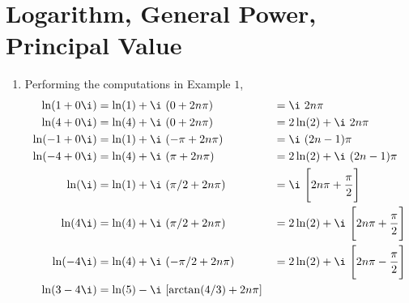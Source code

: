 \section{Logarithm, General Power, Principal Value}

\begin{enumerate}
    \item Performing the computations in Example $ 1 $,
          \begin{align}
              \ln(1 + 0\i)  & = \ln(1) + \i\ (0 + 2n\pi)                        &
                            & = \i\ 2n\pi                                         \\
              \ln(4 + 0\i)  & = \ln(4) + \i\ (0 + 2n\pi)                        &
                            & = 2\ln(2) + \i\ 2n\pi                               \\
              \ln(-1 + 0\i) & = \ln(1) + \i\ (-\pi + 2n\pi)                     &
                            & = \i\ (2n-1)\pi                                     \\
              \ln(-4 + 0\i) & = \ln(4) + \i\ (\pi + 2n\pi)                      &
                            & = 2\ln(2) + \i\ (2n-1)\pi                           \\
              \ln(\i)       & = \ln(1) + \i\ (\pi/2 + 2n\pi)                    &
                            & = \i\ \Bigg[2n\pi + \frac{\pi}{2}\Bigg]             \\
              \ln(4\i)      & = \ln(4) + \i\ (\pi/2 + 2n\pi)                    &
                            & = 2\ln(2) + \i\ \Bigg[2n\pi + \frac{\pi}{2}\Bigg]   \\
              \ln(-4\i)     & = \ln(4) + \i\ (-\pi/2 + 2n\pi)                   &
                            & = 2\ln(2) + \i\ \Bigg[2n\pi - \frac{\pi}{2}\Bigg]   \\
              \ln(3-4\i)    & = \ln(5) - \i\ [\arctan(4/3) + 2n\pi]             &
          \end{align}


\end{enumerate}
